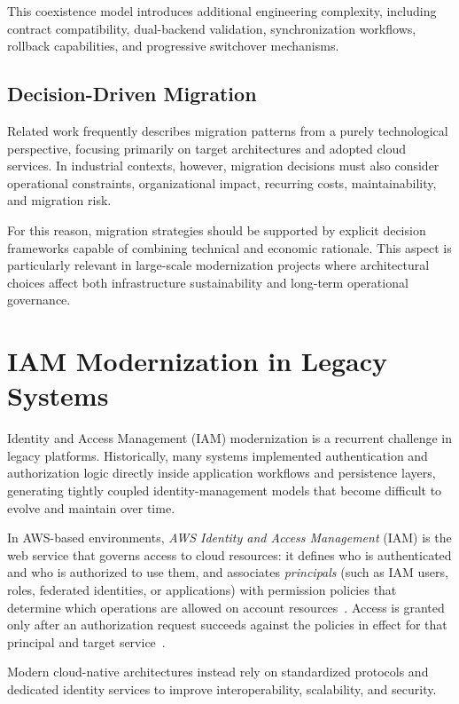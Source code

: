 This coexistence model introduces additional engineering complexity, including contract compatibility, dual-backend validation, synchronization workflows, rollback capabilities, and progressive switchover mechanisms.

\subsection{Decision-Driven Migration}
Related work frequently describes migration patterns from a purely technological perspective, focusing primarily on target architectures and adopted cloud services. In industrial contexts, however, migration decisions must also consider operational constraints, organizational impact, recurring costs, maintainability, and migration risk.

For this reason, migration strategies should be supported by explicit decision frameworks capable of combining technical and economic rationale. This aspect is particularly relevant in large-scale modernization projects where architectural choices affect both infrastructure sustainability and long-term operational governance.

\section{IAM Modernization in Legacy Systems}
Identity and Access Management (IAM) modernization is a recurrent challenge in legacy platforms. Historically, many systems implemented authentication and authorization logic directly inside application workflows and persistence layers, generating tightly coupled identity-management models that become difficult to evolve and maintain over time.

In AWS-based environments, \emph{AWS Identity and Access Management} (IAM) is the web service that governs access to cloud resources: it defines who is authenticated and who is authorized to use them, and associates \emph{principals} (such as IAM users, roles, federated identities, or applications) with permission policies that determine which operations are allowed on account resources~\cite{awsIamIntroduction}. Access is granted only after an authorization request succeeds against the policies in effect for that principal and target service~\cite{awsIamIntroduction}.

Modern cloud-native architectures instead rely on standardized protocols and dedicated identity services to improve interoperability, scalability, and security.

